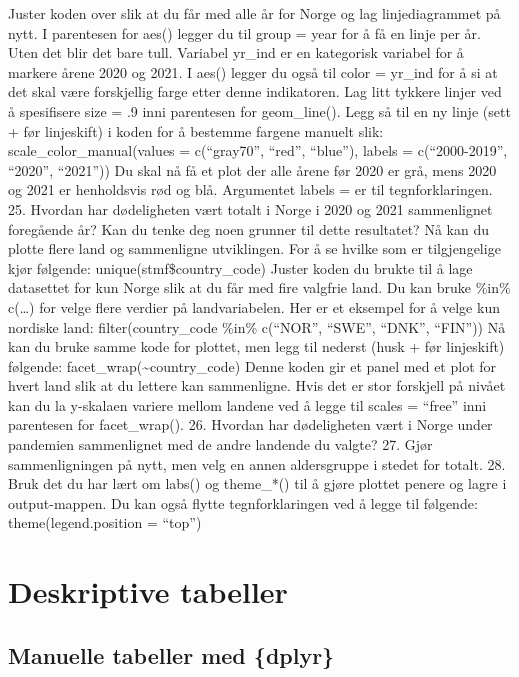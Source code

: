 \documentclass[
  letterpaper,
  DIV=11,
  numbers=noendperiod]{scrreprt}
\begin{document}
Juster koden over slik at du får med alle år for Norge og lag
linjediagrammet på nytt. I parentesen for aes() legger du til group =
year for å få en linje per år. Uten det blir det bare tull. Variabel
yr\_ind er en kategorisk variabel for å markere årene 2020 og 2021. I
aes() legger du også til color = yr\_ind for å si at det skal være
forskjellig farge etter denne indikatoren. Lag litt tykkere linjer ved å
spesifisere size = .9 inni parentesen for geom\_line(). Legg så til en
ny linje (sett + før linjeskift) i koden for å bestemme fargene manuelt
slik:\\
scale\_color\_manual(values = c(``gray70'', ``red'', ``blue''), labels =
c(``2000-2019'', ``2020'', ``2021'')) Du skal nå få et plot der alle
årene før 2020 er grå, mens 2020 og 2021 er henholdsvis rød og blå.
Argumentet labels = er til tegnforklaringen. 25. Hvordan har
dødeligheten vært totalt i Norge i 2020 og 2021 sammenlignet foregående
år? Kan du tenke deg noen grunner til dette resultatet? Nå kan du plotte
flere land og sammenligne utviklingen. For å se hvilke som er
tilgjengelige kjør følgende: unique(stmf\$country\_code) Juster koden du
brukte til å lage datasettet for kun Norge slik at du får med fire
valgfrie land. Du kan bruke \%in\% c(\ldots) for velge flere verdier på
landvariabelen. Her er et eksempel for å velge kun nordiske land:
filter(country\_code \%in\% c(``NOR'', ``SWE'', ``DNK'', ``FIN'')) Nå
kan du bruke samme kode for plottet, men legg til nederst (husk + før
linjeskift) følgende: facet\_wrap(\textasciitilde country\_code) Denne
koden gir et panel med et plot for hvert land slik at du lettere kan
sammenligne. Hvis det er stor forskjell på nivået kan du la y-skalaen
variere mellom landene ved å legge til scales = ``free'' inni parentesen
for facet\_wrap(). 26. Hvordan har dødeligheten vært i Norge under
pandemien sammenlignet med de andre landende du valgte? 27. Gjør
sammenligningen på nytt, men velg en annen aldersgruppe i stedet for
totalt. 28. Bruk det du har lært om labs() og theme\_*() til å gjøre
plottet penere og lagre i output-mappen. Du kan også flytte
tegnforklaringen ved å legge til følgende: theme(legend.position =
``top'')


\hypertarget{deskriptive-tabeller}{%
\chapter{Deskriptive tabeller}\label{deskriptive-tabeller}}

\hypertarget{manuelle-tabeller-med-dplyr}{%
\section{Manuelle tabeller med
\{dplyr\}}\label{manuelle-tabeller-med-dplyr}}
\end{document}
